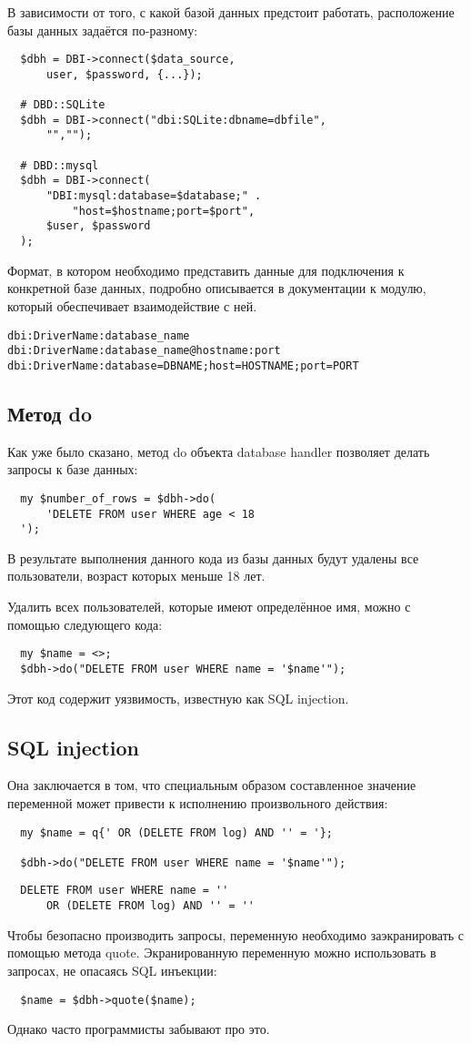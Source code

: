В зависимости от того, с какой базой данных предстоит работать, расположение базы данных задаётся по-разному:
\begin{verbatim}
  $dbh = DBI->connect($data_source,
      user, $password, {...});

  # DBD::SQLite
  $dbh = DBI->connect("dbi:SQLite:dbname=dbfile",
      "","");

  # DBD::mysql
  $dbh = DBI->connect(
      "DBI:mysql:database=$database;" .
          "host=$hostname;port=$port",
      $user, $password
  );
\end{verbatim}
Формат, в котором необходимо представить данные для подключения к конкретной базе данных, подробно описывается в документации к модулю, который обеспечивает взаимодействие с ней.
\begin{verbatim}
dbi:DriverName:database_name
dbi:DriverName:database_name@hostname:port
dbi:DriverName:database=DBNAME;host=HOSTNAME;port=PORT
\end{verbatim}

\subsection{Метод do}
Как уже было сказано, метод do объекта database handler позволяет делать запросы к базе данных:
\begin{verbatim}
  my $number_of_rows = $dbh->do(
      'DELETE FROM user WHERE age < 18
  ');
\end{verbatim}
В результате выполнения данного кода из базы данных будут удалены все пользователи, возраст которых меньше 18 лет.

Удалить всех пользователей, которые имеют определённое имя, можно с помощью следующего кода:
\begin{verbatim}
  my $name = <>;
  $dbh->do("DELETE FROM user WHERE name = '$name'");
\end{verbatim}
Этот код содержит уязвимость, известную как SQL injection.

\subsection{SQL injection}
Она заключается в том, что специальным образом составленное значение переменной может привести к исполнению произвольного действия:
\begin{verbatim}
  my $name = q{' OR (DELETE FROM log) AND '' = '};

  $dbh->do("DELETE FROM user WHERE name = '$name'");
\end{verbatim}
\begin{verbatim}
  DELETE FROM user WHERE name = ''
      OR (DELETE FROM log) AND '' = ''
\end{verbatim}
Чтобы безопасно производить запросы, переменную необходимо заэкранировать с помощью метода quote. Экранированную переменную можно использовать в запросах, не опасаясь SQL инъекции:
\begin{verbatim}
  $name = $dbh->quote($name);
\end{verbatim}
Однако часто программисты забывают про это.

